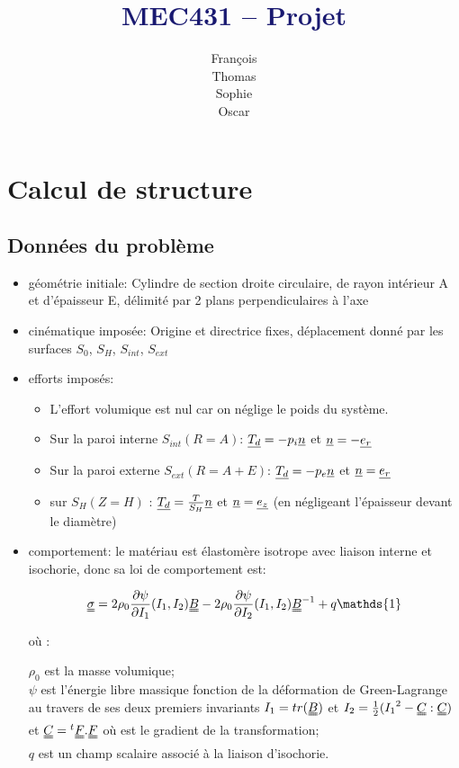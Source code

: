\documentclass[a4paper,11pt]{article}
\newcommand{\titleinfo}{\textcolor{MidnightBlue}{MEC431 – Projet}}
\newcommand{\tens}{\uuline}
\begin{document}
\title{\titleinfo}
\author{
	François 
	\\
	Thomas 
	\\
	Sophie 
	\\
	Oscar 
}
\date{}
\maketitle

\section{Calcul de structure}

\subsection{Données du problème}

\begin{itemize}
\item géométrie initiale:
Cylindre de section droite circulaire, de rayon intérieur A et d'épaisseur E, délimité par 2 plans perpendiculaires à l'axe
\item cinématique imposée:
Origine et directrice fixes, déplacement donné par les surfaces $S_{0}$,  $S_H$, $S_{int}$, $S_{ext}$
\item efforts imposés:
	\begin{itemize}
	\item L'effort volumique est nul car on néglige le poids du système.
	\item Sur la paroi interne $S_{int} (R=A)$:  $\uline{T_d} = -p_i \uline{n}$ et $\uline{n} =- \uline{e_r}$
	\item Sur la paroi externe $S_{ext} (R=A+E)$:  $\uline {T_d} = -p_e \uline{n}$ et $\uline{n} = \uline{e_r}$
	\item sur $S_H (Z=H)$ : $\uline{T_d} = \frac{T}{S_H}\uline{n}$ et $\uline{n} = \uline{e_z}$ (en négligeant l'épaisseur devant le diamètre)
	\end{itemize}
\item comportement: le matériau est élastomère isotrope avec liaison interne et isochorie, donc sa loi de comportement est:
\begin{center}
$$
\tens{\sigma}=2\rho_0\frac{\partial\psi}{\partial I_1}(I_1,I_2)\tens{B} -2\rho_0\frac{\partial\psi}{\partial I_2}(I_1,I_2) \tens{B}^{-1}+q\mathds{1}$$
\end{center}
où :
\begin{flushleft}
$\rho_0$ est la masse volumique;\\
$\psi$ est l'énergie libre massique fonction de la déformation de Green-Lagrange \tens{e} au travers de ses deux premiers invariants $I_1= tr(\tens{B})$ et $I_2=\frac{1}{2}({I_1}^2-\tens{C}:\tens{C})$ et $\tens{C} = {}^t\tens{F}.\tens{F}$ où \tens{F} est le gradient de la transformation;
\\
$q$ est un champ scalaire associé à la liaison d'isochorie.
\end{flushleft}
\end{itemize}
\end{document}
